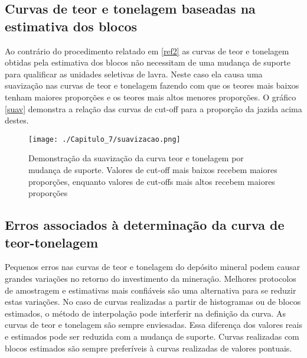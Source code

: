 \subsection{Curvas de teor e tonelagem baseadas na estimativa dos blocos}

Ao contrário do procedimento relatado em \eqref{ref2} as curvas de teor e tonelagem obtidas pela estimativa dos blocos não necessitam de uma mudança de suporte para qualificar as unidades seletivas de lavra. Neste caso ela causa uma suavização nas curvas de teor e tonelagem fazendo com que os teores mais baixos tenham maiores proporções e os teores mais altos menores proporções. O gráfico \eqref{suav} demonstra a relação das curvas de cut-off para a proporção da jazida acima destes. 


\begin{figure}[H]
	\centering
	\texttt{[image: ./Capitulo\_7/suavizacao.png]}	
	\caption{Demonstração da suavização da curva teor e tonelagem por mudança de suporte. Valores de cut-off mais baixos recebem maiores proporções, enquanto valores de cut-offs mais altos recebem maiores proporções}
	\label{suav}
\end{figure} 
 
 \subsection{Erros associados à determinação da curva de teor-tonelagem}
 
 Pequenos erros nas curvas de teor e tonelagem do depósito mineral podem causar grandes variações no retorno do investimento da mineração. Melhores protocolos de amostragem e estimativas mais confiáveis são uma alternativa para se reduzir estas variações. No caso de curvas realizadas a partir de histogramas ou de blocos estimados, o método de interpolação pode interferir na definição da curva. As curvas de teor e tonelagem são sempre enviesadas. Essa diferença dos valores reais e estimados pode ser reduzida com a mudança de suporte. Curvas realizadas com blocos estimados são sempre preferíveis à curvas realizadas de valores pontuais. 
  
